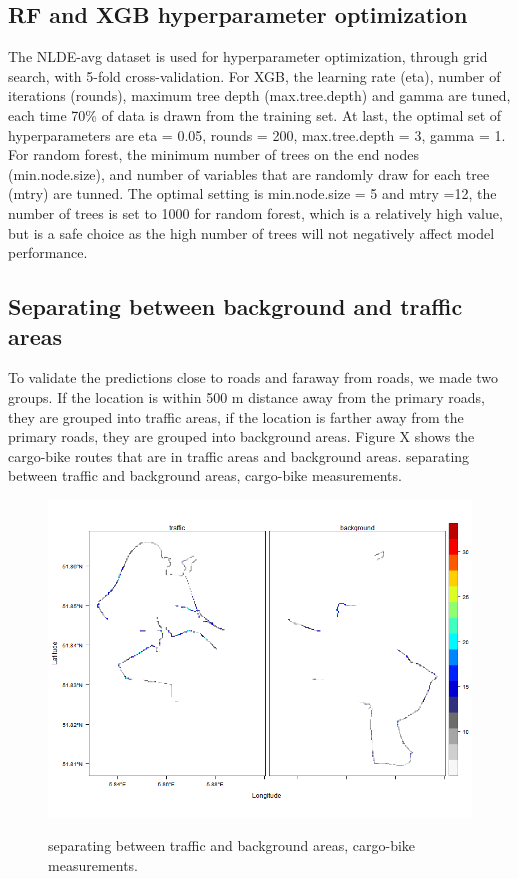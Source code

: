 \documentclass{article}
\begin{document}
\subsection{RF and XGB hyperparameter optimization}
The NLDE-avg dataset is used for hyperparameter optimization, through grid search, with 5-fold cross-validation. For XGB, the learning rate (eta), number of iterations (rounds), maximum tree depth (max.tree.depth) and gamma are tuned, each time 70\% of data is drawn from the training set. At last, the optimal set of hyperparameters are eta = 0.05, rounds = 200, max.tree.depth = 3, gamma = 1. For random forest, the minimum number of trees on the end nodes (min.node.size), and  number of variables that are randomly draw for each tree (mtry) are tunned. The optimal setting is min.node.size = 5 and mtry =12, the number of trees is set to 1000 for random forest, which is a relatively high value, but is a safe choice as the high number of trees will not negatively affect model performance.

\subsection{Separating between background and traffic areas}
To validate the predictions close to roads and faraway from roads, we made two groups. If the location is within 500 m distance away from the primary roads, they are grouped into traffic areas, if the location is farther away from the primary roads, they are grouped into background areas. Figure X shows the cargo-bike routes that are in traffic areas and background areas. 
separating between traffic and background areas, cargo-bike measurements.
\begin{figure}[H]
    \includegraphics[width=\linewidth]{f2.png}
    \label{seperate}
    \caption {separating between traffic and background areas, cargo-bike measurements.}
\end{figure}
\end{document}
